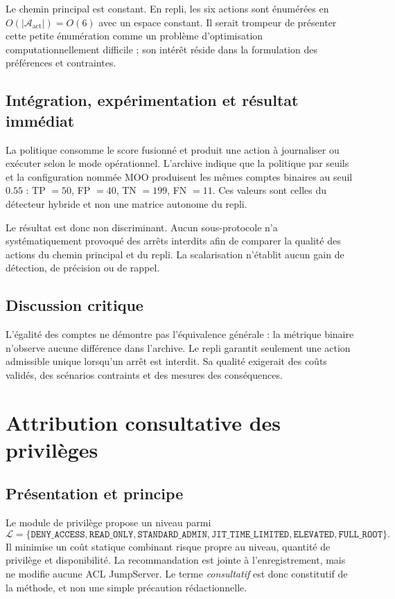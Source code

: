\documentclass[11pt,a4paper,oneside]{report}
\theoremstyle{definition}
\theoremstyle{plain}
\begin{document}
Le chemin principal est constant. En repli, les six actions sont énumérées en
$O(|\mathcal{A}_{\mathrm{act}}|)=O(6)$ avec un espace constant. Il serait trompeur de présenter cette petite énumération comme un problème d'optimisation computationnellement difficile ; son intérêt réside dans la formulation des préférences et contraintes.

\subsection*{Intégration, expérimentation et résultat immédiat}

La politique consomme le score fusionné et produit une action à journaliser ou exécuter selon le mode opérationnel. L'archive indique que la politique par seuils et la configuration nommée MOO produisent les mêmes comptes binaires au seuil $0.55$ : TP $=50$, FP $=40$, TN $=199$, FN $=11$. Ces valeurs sont celles du détecteur hybride et non une matrice autonome du repli.

Le résultat est donc non discriminant. Aucun sous-protocole n'a systématiquement provoqué des arrêts interdits afin de comparer la qualité des actions du chemin principal et du repli. La scalarisation n'établit aucun gain de détection, de précision ou de rappel.

\subsection*{Discussion critique}

L'égalité des comptes ne démontre pas l'équivalence générale : la métrique binaire n'observe aucune différence dans l'archive. Le repli garantit seulement une action admissible unique lorsqu'un arrêt est interdit. Sa qualité exigerait des coûts validés, des scénarios contraints et des mesures des conséquences.

\section{Attribution consultative des privilèges}
\label{sec:ai-ro-privilege}

\subsection*{Présentation et principe}

Le module de privilège propose un niveau parmi
\[
\mathcal{L}=\{\texttt{DENY\_ACCESS},\texttt{READ\_ONLY},
\texttt{STANDARD\_ADMIN},\texttt{JIT\_TIME\_LIMITED},
\texttt{ELEVATED},\texttt{FULL\_ROOT}\}.
\]
Il minimise un coût statique combinant risque propre au niveau, quantité de privilège et disponibilité. La recommandation est jointe à l'enregistrement, mais ne modifie aucune ACL JumpServer. Le terme \emph{consultatif} est donc constitutif de la méthode, et non une simple précaution rédactionnelle.
\end{document}
